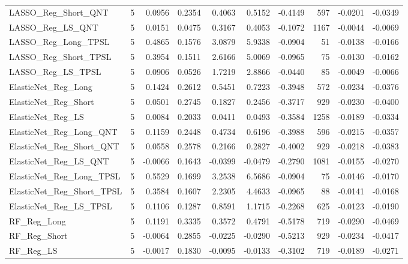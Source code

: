 \begin{tabular}{llrrrrrrrr}
\cline{1-10}
LASSO\_Reg\_Short\_QNT & 5 & 0.0956 & 0.2354 & 0.4063 & 0.5152 & -0.4149 & 597 & -0.0201 & -0.0349 \\
\cline{1-10}
LASSO\_Reg\_LS\_QNT & 5 & 0.0151 & 0.0475 & 0.3167 & 0.4053 & -0.1072 & 1167 & -0.0044 & -0.0069 \\
\cline{1-10}
LASSO\_Reg\_Long\_TPSL & 5 & 0.4865 & 0.1576 & 3.0879 & 5.9338 & -0.0904 & 51 & -0.0138 & -0.0166 \\
\cline{1-10}
LASSO\_Reg\_Short\_TPSL & 5 & 0.3954 & 0.1511 & 2.6166 & 5.0069 & -0.0965 & 75 & -0.0130 & -0.0162 \\
\cline{1-10}
LASSO\_Reg\_LS\_TPSL & 5 & 0.0906 & 0.0526 & 1.7219 & 2.8866 & -0.0440 & 85 & -0.0049 & -0.0066 \\
\cline{1-10}
ElasticNet\_Reg\_Long & 5 & 0.1424 & 0.2612 & 0.5451 & 0.7223 & -0.3948 & 572 & -0.0234 & -0.0376 \\
\cline{1-10}
ElasticNet\_Reg\_Short & 5 & 0.0501 & 0.2745 & 0.1827 & 0.2456 & -0.3717 & 929 & -0.0230 & -0.0400 \\
\cline{1-10}
ElasticNet\_Reg\_LS & 5 & 0.0084 & 0.2033 & 0.0411 & 0.0493 & -0.3584 & 1258 & -0.0189 & -0.0334 \\
\cline{1-10}
ElasticNet\_Reg\_Long\_QNT & 5 & 0.1159 & 0.2448 & 0.4734 & 0.6196 & -0.3988 & 596 & -0.0215 & -0.0357 \\
\cline{1-10}
ElasticNet\_Reg\_Short\_QNT & 5 & 0.0558 & 0.2578 & 0.2166 & 0.2827 & -0.4002 & 929 & -0.0218 & -0.0383 \\
\cline{1-10}
ElasticNet\_Reg\_LS\_QNT & 5 & -0.0066 & 0.1643 & -0.0399 & -0.0479 & -0.2790 & 1081 & -0.0155 & -0.0270 \\
\cline{1-10}
ElasticNet\_Reg\_Long\_TPSL & 5 & 0.5529 & 0.1699 & 3.2538 & 6.5686 & -0.0904 & 75 & -0.0146 & -0.0170 \\
\cline{1-10}
ElasticNet\_Reg\_Short\_TPSL & 5 & 0.3584 & 0.1607 & 2.2305 & 4.4633 & -0.0965 & 88 & -0.0141 & -0.0168 \\
\cline{1-10}
ElasticNet\_Reg\_LS\_TPSL & 5 & 0.1106 & 0.1287 & 0.8591 & 1.1715 & -0.2268 & 625 & -0.0123 & -0.0190 \\
\cline{1-10}
RF\_Reg\_Long & 5 & 0.1191 & 0.3335 & 0.3572 & 0.4791 & -0.5178 & 719 & -0.0290 & -0.0469 \\
\cline{1-10}
RF\_Reg\_Short & 5 & -0.0064 & 0.2855 & -0.0225 & -0.0290 & -0.5213 & 929 & -0.0234 & -0.0417 \\
\cline{1-10}
RF\_Reg\_LS & 5 & -0.0017 & 0.1830 & -0.0095 & -0.0133 & -0.3102 & 719 & -0.0189 & -0.0271 \\

\end{tabular}
